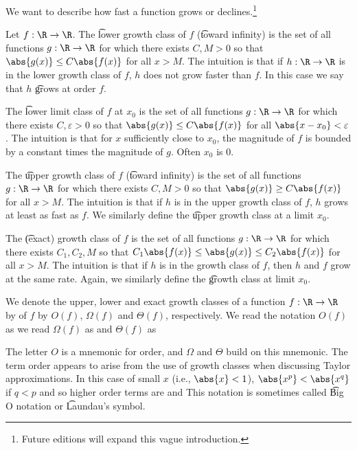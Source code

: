 

We want to describe how fast a function grows or declines.\footnote{Future editions will expand this vague introduction.}


Let $f: \R \to \R$.
The \t{lower growth class} of $f$ (\t{toward infinity}) is the set of all functions $g: \R \to \R$ for which there exists $C, M > 0$ so that $\abs{g(x)} \leq C\abs{f(x)}$ for all $x > M$.
The intuition is that if $h: \R \to \R$ is in the lower growth class of $f$, $h$ does not grow faster than $f$.
In this case we say that $h$ \t{grows at order} $f$.

The \t{lower limit class of $f$ at $x_0$} is the set of all functions $g: \R \to \R$ for which there exists $C, \varepsilon > 0$ so that $\abs{g(x)} \leq C \abs{f(x)}$ for all $\abs{x - x_0} < \varepsilon$.
The intuition is that for $x$ sufficiently close to $x_0$, the magnitude of $f$ is bounded by a constant times the magnitude of $g$.
Often $x_0$ is $0$.

The \t{upper growth class} of $f$ (\t{toward infinity}) is the set of all functions $g: \R \to \R$ for which there exists $C, M > 0$ so that $\abs{g(x)} \geq C\abs{f(x)}$ for all $x > M$.
The intuition is that if $h$ is in the upper growth class of $f$, $h$ grows at least as fast as $f$.
We similarly define the \t{upper growth class at a limit $x_0$}.


The \t{(exact) growth class} of $f$ is the set of all functions $g: \R \to \R$ for which there exists $C_1, C_2, M$ so that $C_1\abs{f(x)} \leq \abs{g(x)} \leq C_2 \abs{f(x)}$ for all $x > M$.
The intuition is that if $h$ is in the growth class of $f$, then $h$ and $f$ grow at the same rate.
Again, we similarly define the \t{growth class at limit $x_0$}.


We denote the upper, lower and exact growth classes of a function $f: \R \to \R$ by  of $f$ by $O(f)$, $\Omega(f)$ and $\Theta(f)$, respectively.
We read the notation $O(f)$ as  we read $\Omega(f)$ as  and $\Theta(f)$ as 

The letter $O$ is a mnemonic for order, and $\Omega$ and $\Theta$ build on this mnemonic.
The term order appears to arise from the use of growth classes when discussing Taylor approximations.
In this case of small $x$ (i.e.,  $\abs{x} < 1$), $\abs{x^p} < \abs{x^q}$ if $q < p$ and so higher order terms are  and 
This notation is sometimes called \t{Big O notation} or \t{Laundau's symbol}.

